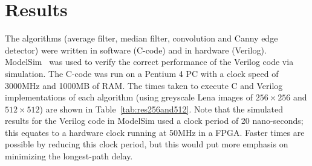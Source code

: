 \documentclass[10pt,twocolumn,letterpaper]{article}
\begin{document}
\section{Results}
The algorithms (average filter, median filter, convolution and Canny edge detector) were written in software (C-code) and
in hardware (Verilog). 
ModelSim~\cite{modelsim} was used to verify the correct performance of the Verilog code via simulation.  
The C-code was run on a Pentium 4 PC with a clock speed of 3000MHz and 1000MB of RAM.
The times taken to execute C and Verilog implementations of each algorithm 
(using greyscale Lena images of $256\times256$ and $512\times512$)
are shown in Table~\ref{tab:res256and512}. 
Note that the simulated results for the Verilog code in ModelSim used a clock period of 20 nano-seconds;
this equates to a hardware clock running at 50MHz in a FPGA. Faster times are possible by
reducing this clock period, but this would put more emphasis on minimizing the longest-path delay. 
\end{document}
